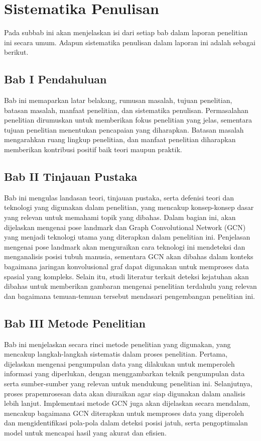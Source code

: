 \section{Sistematika Penulisan} \label{I.Sistematika}
Pada subbab ini akan menjelaskan isi dari setiap bab dalam laporan penelitian ini secara umum.  Adapun sistematika penulisan dalam laporan ini adalah sebagai berikut.\par
\subsection{Bab I Pendahuluan}
Bab ini memaparkan latar belakang, rumusan masalah, tujuan penelitian, batasan masalah, manfaat penelitian, dan sistematika penulisan. Permasalahan penelitian dirumuskan untuk memberikan fokus penelitian yang jelas, sementara tujuan penelitian menentukan pencapaian yang diharapkan. Batasan masalah mengarahkan ruang lingkup penelitian, dan manfaat penelitian diharapkan memberikan kontribusi positif baik teori maupun praktik.\par

\subsection{Bab II Tinjauan Pustaka}
Bab ini mengulas landasan teori, tinjauan pustaka, serta defenisi teori dan teknologi yang digunakan dalam penelitian, yang mencakup konsep-konsep dasar yang relevan untuk memahami topik yang dibahas. Dalam bagian ini, akan dijelaskan mengenai pose landmark dan Graph Convolutional Network (GCN) yang menjadi teknologi utama yang diterapkan dalam penelitian ini. Penjelasan mengenai pose landmark akan menguraikan cara teknologi ini mendeteksi dan menganalisis posisi tubuh manusia, sementara GCN akan dibahas dalam konteks bagaimana jaringan konvolusional graf dapat digunakan untuk memproses data spasial yang kompleks. Selain itu, studi literatur terkait deteksi kejatuhan akan dibahas untuk memberikan gambaran mengenai penelitian terdahulu yang relevan dan bagaimana temuan-temuan tersebut mendasari pengembangan penelitian ini.\par

\subsection{Bab III Metode Penelitian}
Bab ini menjelaskan secara rinci metode penelitian yang digunakan, yang mencakup langkah-langkah sistematis dalam proses penelitian. Pertama, dijelaskan mengenai pengumpulan data yang dilakukan untuk memperoleh informasi yang diperlukan, dengan menggambarkan teknik pengumpulan data serta sumber-sumber yang relevan untuk mendukung penelitian ini. Selanjutnya, proses prapemrosesan data akan diuraikan agar siap digunakan dalam analisis lebih lanjut. Implementasi metode GCN juga akan dijelaskan secara mendalam, mencakup bagaimana GCN diterapkan untuk memproses data yang diperoleh dan mengidentifikasi pola-pola dalam deteksi posisi jatuh, serta pengoptimalan model untuk mencapai hasil yang akurat dan efisien.\par

